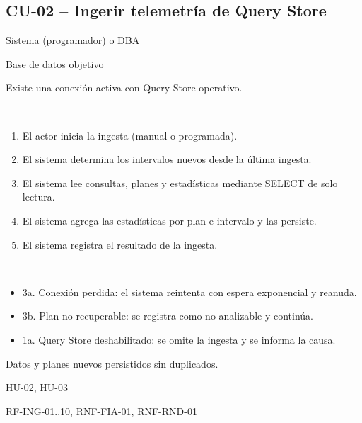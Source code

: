 \documentclass[11pt,a4paper]{report}
\begin{document}
\subsection{CU-02 -- Ingerir telemetría de Query Store}
\begin{description}[leftmargin=3.3cm,style=nextline]
\item[Actor principal] Sistema (programador) o DBA
\item[Actor secundario] Base de datos objetivo
\item[Precondiciones] Existe una conexión activa con Query Store operativo.
\item[Flujo principal]~
\begin{enumerate}[leftmargin=1.3em,itemsep=1pt]
\item El actor inicia la ingesta (manual o programada).
\item El sistema determina los intervalos nuevos desde la última ingesta.
\item El sistema lee consultas, planes y estadísticas mediante SELECT de solo lectura.
\item El sistema agrega las estadísticas por plan e intervalo y las persiste.
\item El sistema registra el resultado de la ingesta.
\end{enumerate}
\item[Flujos alternos]~
\begin{itemize}[leftmargin=1.3em,itemsep=1pt]
\item 3a. Conexión perdida: el sistema reintenta con espera exponencial y reanuda.
\item 3b. Plan no recuperable: se registra como no analizable y continúa.
\item 1a. Query Store deshabilitado: se omite la ingesta y se informa la causa.
\end{itemize}
\item[Postcondici\'on] Datos y planes nuevos persistidos sin duplicados.
\item[Historias relacionadas] HU-02, HU-03
\item[Requisitos relacionados] RF-ING-01..10, RNF-FIA-01, RNF-RND-01
\end{description}
\end{document}
